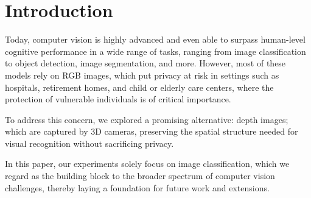 \section{Introduction}
Today, computer vision is highly advanced and even able to surpass human-level cognitive performance in a wide range of tasks, ranging from image classification to object detection, image segmentation, and more. However, most of these models rely on RGB images, which put privacy at risk in settings such as hospitals, retirement homes, and child or elderly care centers, where the protection of vulnerable individuals is of critical importance.

To address this concern, we explored a promising alternative: depth images; which are captured by 3D cameras, preserving the spatial structure needed for visual recognition without sacrificing privacy.

In this paper, our experiments solely focus on image classification, which we regard as the building block to the broader spectrum of computer vision challenges, thereby laying a foundation for future work and extensions.
